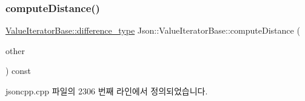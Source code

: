 \subsubsection{\texorpdfstring{compute\+Distance()}{computeDistance()}}
{\footnotesize\ttfamily \hyperlink{class_json_1_1_value_iterator_base_a4e44bf8cbd17ec8d6e2c185904a15ebd}{Value\+Iterator\+Base\+::difference\+\_\+type} Json\+::\+Value\+Iterator\+Base\+::compute\+Distance (\begin{DoxyParamCaption}\item[{const \hyperlink{class_json_1_1_value_iterator_base_a9d2a940d03ea06d20d972f41a89149ee}{Self\+Type} \&}]{other }\end{DoxyParamCaption}) const\hspace{0.3cm}{\ttfamily [protected]}}



jsoncpp.\+cpp 파일의 2306 번째 라인에서 정의되었습니다.



